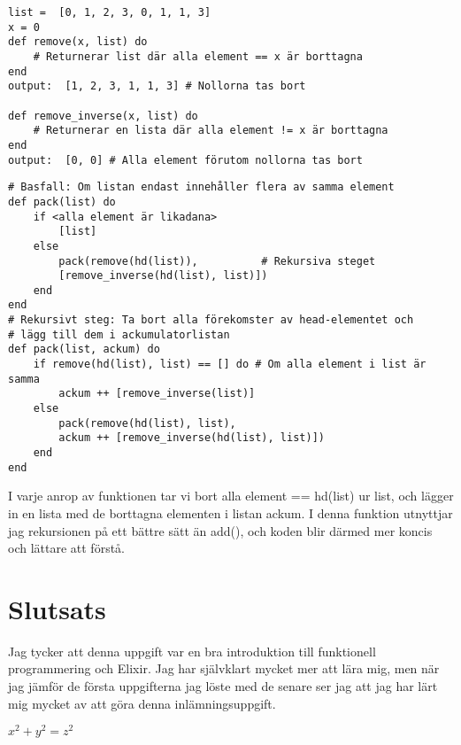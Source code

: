 \documentclass[a4paper,11pt]{article}
\begin{document}
\begin{verbatim}
list =  [0, 1, 2, 3, 0, 1, 1, 3]
x = 0
def remove(x, list) do
    # Returnerar list där alla element == x är borttagna
end
output:  [1, 2, 3, 1, 1, 3] # Nollorna tas bort

def remove_inverse(x, list) do
    # Returnerar en lista där alla element != x är borttagna
end
output:  [0, 0] # Alla element förutom nollorna tas bort

\end{verbatim}
\begin{verbatim}
# Basfall: Om listan endast innehåller flera av samma element
def pack(list) do
    if <alla element är likadana>
        [list]
    else
        pack(remove(hd(list)),          # Rekursiva steget
        [remove_inverse(hd(list), list)])
    end
end
# Rekursivt steg: Ta bort alla förekomster av head-elementet och 
# lägg till dem i ackumulatorlistan
def pack(list, ackum) do
    if remove(hd(list), list) == [] do # Om alla element i list är samma
        ackum ++ [remove_inverse(list)]
    else
        pack(remove(hd(list), list),
        ackum ++ [remove_inverse(hd(list), list)])
    end
end
\end{verbatim}
I varje anrop av funktionen tar vi bort alla element == hd(list) ur list, och lägger in en lista med de borttagna elementen i listan ackum. I denna funktion utnyttjar jag rekursionen på ett bättre sätt än add(), och koden blir därmed mer koncis och lättare att förstå.

\section*{Slutsats}
Jag tycker att denna uppgift var en bra introduktion till funktionell programmering och Elixir. Jag har självklart mycket mer att lära mig, men när jag jämför de första uppgifterna jag löste med de senare ser jag att jag har lärt mig mycket av att göra denna inlämningsuppgift.


\(x^2 + y^2 = z^2\)
\end{document}
